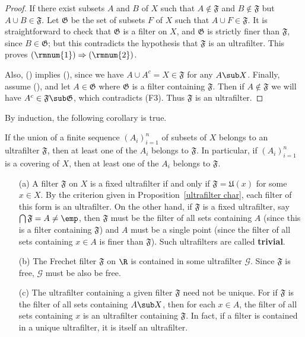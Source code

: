 \begin{proof}
If there exist subsets $A$ and $B$ of $X$ such that $A\notin\mathfrak{F}$ and $B\notin\mathfrak{F}$ but $A\cup B\in\mathfrak{F}$. Let $\mathfrak{G}$ be the set of subsets $F$ of $X$ such that $A\cup F\in\mathfrak{F}$. It is straightforward to check that $\mathfrak{G}$ is a filter on $X$, and $\mathfrak{G}$ is strictly finer than $\mathfrak{F}$, since $B\in\mathfrak{G}$; but this contradicts the hypothesis that $\mathfrak{F}$ is an ultrafilter. This proves $(\rmnum{1})\Rightarrow(\rmnum{2})$.\par
Also, () implies (), since we have $A\cup A^c=X\in\mathfrak{F}$ for any $A\sub X$. Finally, assume (), and let $A\in\mathfrak{G}$ where $\mathfrak{G}$ is a filter containing $\mathfrak{F}$. Then if $A\notin\mathfrak{F}$ we will have $A^c\in\mathfrak{F}\sub\mathfrak{G}$, which contradicts (F3). Thus $\mathfrak{F}$ is an ultrafilter. 
\end{proof}
By induction, the following corollary is true.
\begin{corollary}
If the union of a finite sequence $(A_i)_{i=1}^{n}$ of subsets of $X$ belongs to an ultrafilter $\mathfrak{F}$, then at least one of the $A_i$ belongs to $\mathfrak{F}$. In particular, if $(A_i)_{i=1}^{n}$ is a covering of $X$, then at least one of the $A_i$ belongs to $\mathfrak{F}$.
\end{corollary}
\begin{example}
\mbox{}
\begin{itemize}
\item[(a)] A filter $\mathfrak{F}$ on $X$ is a fixed ultrafilter if and only if $\mathfrak{F}=\mathfrak{U}(x)$ for some $x\in X$. By the criterion given in Proposition~\ref{ultrafilter char}, each filter of this form is an ultrafilter. On the other hand, if $\mathfrak{F}$ is a fixed ultrafilter, say $\bigcap\mathfrak{F}=A\neq\emp$, then $\mathfrak{F}$ must be the filter of all sets containing $A$ (since this is a filter containing $\mathfrak{F}$) and $A$ must be a single point (since the filter of all sets containing $x\in A$ is finer than $\mathfrak{F}$). Such ultrafilters are called \textbf{trivial}.
\item[(b)] The Frechet filter $\mathfrak{F}$ on $\R$ is contained in some ultrafilter $\mathcal{G}$. Since $\mathfrak{F}$ is free, $\mathcal{G}$ must be also be free.
\item[(c)] The ultrafilter containing a given filter $\mathfrak{F}$ need not be unique. For if $\mathfrak{F}$ is the filter of all sets containing $A\sub X$, then for each $x\in A$, the filter of all sets containing $x$ is an ultrafilter containing $\mathfrak{F}$. In fact, if a filter is contained in a unique ultrafilter, it is itself an ultrafilter.
\end{itemize}
\end{example}
